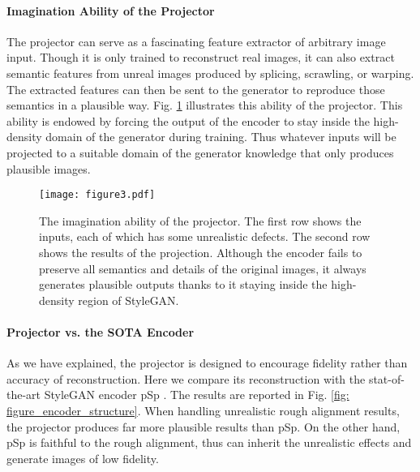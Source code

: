 \documentclass[10pt,twocolumn,letterpaper]{article}
\begin{document}
\paragraph{Imagination Ability of the Projector} The projector can serve as a fascinating feature extractor of arbitrary image input. Though it is only trained to reconstruct real images, it can also extract semantic features from unreal images produced by splicing, scrawling, or warping. The extracted features can then be sent to the generator to reproduce those semantics in a plausible way. Fig. \ref{fig: encoder-imagination} illustrates this ability of the projector. This ability is endowed by forcing the output of the encoder to stay inside the high-density domain of the generator during training. Thus whatever inputs will be projected to a suitable domain of the generator knowledge that only produces plausible images.



\begin{figure}[t]
  \centering
  \texttt{[image: figure3.pdf]}\caption{The imagination ability of the projector. The first row shows the inputs, each of which has some unrealistic defects. The second row shows the results of the projection. Although the encoder fails to preserve all semantics and details of the original images, it always generates plausible outputs thanks to it staying inside the high-density region of StyleGAN. }\label{fig: encoder-imagination}\end{figure}



\paragraph{Projector vs. the SOTA Encoder} As we have explained, the projector is designed to encourage fidelity rather than accuracy of reconstruction. Here we compare its reconstruction with the stat-of-the-art StyleGAN encoder pSp \cite{richardson2021encoding}. The results are reported in Fig. \ref{fig: figure_encoder_structure}. When handling unrealistic rough alignment results, the projector produces far more plausible results than pSp. On the other hand, pSp is faithful to the rough alignment, thus can inherit the unrealistic effects and generate images of low fidelity.
\end{document}
